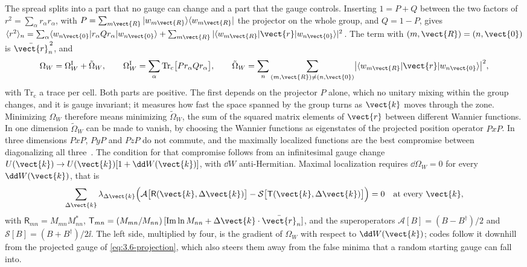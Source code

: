 The spread splits into a part that no gauge can change and a part that the gauge controls. Inserting $1 = P + Q$ between the two factors of $r^2 = \sum_\alpha r_\alpha r_\alpha$, with $P = \sum_{m\vect{R}}|w_{m\vect{R}}\rangle\langle w_{m\vect{R}}|$ the projector on the whole group, and $Q = 1 - P$, gives $\langle r^2\rangle_n = \sum_\alpha\langle w_{n\vect{0}}|r_\alpha Qr_\alpha|w_{n\vect{0}}\rangle + \sum_{m\vect{R}}|\langle w_{m\vect{R}}|\vect{r}|w_{n\vect{0}}\rangle|^2$. The term with $(m,\vect{R}) = (n,\vect{0})$ is $\bar{\vect{r}}_n^{\,2}$, and~\cite[Eqs.~(13)--(16)]{marzari1997maximally}
\begin{equation}
  \Omega_W = \Omega_W^{\mathrm{I}} + \tilde\Omega_W, \qquad
  \Omega_W^{\mathrm{I}} = \sum_\alpha\mathrm{Tr}_{\mathrm{c}}\bigl[P r_\alpha Q r_\alpha\bigr], \qquad
  \tilde\Omega_W = \sum_n\sum_{(m,\vect{R})\ne(n,\vect{0})}\bigl|\langle w_{m\vect{R}}|\vect{r}|w_{n\vect{0}}\rangle\bigr|^2 ,
  \label{eq:3.6-split}
\end{equation}
with $\mathrm{Tr}_{\mathrm{c}}$ a trace per cell. Both parts are positive. The first depends on the projector $P$ alone, which no unitary mixing within the group changes, and it is gauge invariant; it measures how fast the space spanned by the group turns as $\vect{k}$ moves through the zone. Minimizing $\Omega_W$ therefore means minimizing $\tilde\Omega_W$, the sum of the squared matrix elements of $\vect{r}$ between different Wannier functions. In one dimension $\tilde\Omega_W$ can be made to vanish, by choosing the Wannier functions as eigenstates of the projected position operator $PxP$. In three dimensions $PxP$, $PyP$ and $PzP$ do not commute, and the maximally localized functions are the best compromise between diagonalizing all three~\cite[Sect.~III]{marzari1997maximally}. The condition for that compromise follows from an infinitesimal gauge change $U(\vect{k}) \to U(\vect{k})[1 + \dd W(\vect{k})]$, with $\dd W$ anti-Hermitian. Maximal localization requires $\dd\Omega_W = 0$ for every $\dd W(\vect{k})$, that is~\cite[Eq.~(52)]{marzari1997maximally}
\begin{equation}
  \sum_{\Delta\vect{k}}\lambda_{\Delta\vect{k}}\Bigl(\mathcal{A}\bigl[\mathsf{R}(\vect{k},\Delta\vect{k})\bigr] - \mathcal{S}\bigl[\mathsf{T}(\vect{k},\Delta\vect{k})\bigr]\Bigr) = 0
  \quad\text{at every }\vect{k},
  \label{eq:3.6-stationary}
\end{equation}
with $\mathsf{R}_{mn} = M_{mn}M^*_{nn}$, $\mathsf{T}_{mn} = (M_{mn}/M_{nn})\,[\mathrm{Im}\ln M_{nn} + \Delta\vect{k}\cdot\bar{\vect{r}}_n]$, and the superoperators $\mathcal{A}[B] = (B - B^\dagger)/2$ and $\mathcal{S}[B] = (B + B^\dagger)/2\ii$. The left side, multiplied by four, is the gradient of $\Omega_W$ with respect to $\dd W(\vect{k})$; codes follow it downhill from the projected gauge of \cref{eq:3.6-projection}, which also steers them away from the false minima that a random starting gauge can fall into.


